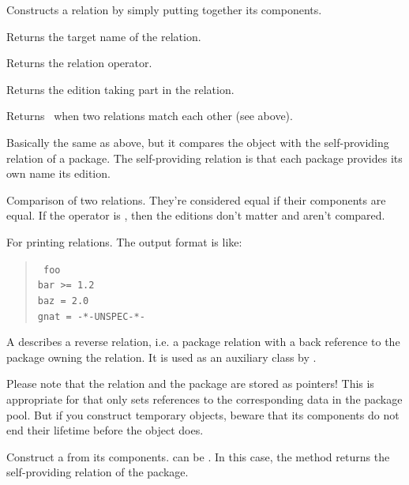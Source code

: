 \documentclass[10pt]{article}
\begin{document}
Constructs a relation by simply putting together its components.

Returns the target name of the relation.

Returns the relation operator.

Returns the edition taking part in the relation.

Returns \true\ when two relations match each other (see above).

Basically the same as above, but it compares the object with the
self-providing relation of a package. The self-providing relation is
that each package provides its own name \val{=} its edition.

Comparison of two relations. They're considered equal if their
components are equal. If the operator is , then the editions
don't matter and aren't compared.

For printing relations. The output format is like:
\begin{quote}\tt
foo \\
bar >= 1.2 \\
baz = 2.0 \\
gnat = -*-UNSPEC-*-
\end{quote}




A  describes a reverse relation, i.e. a package
relation with a back reference to the package owning the relation. It
is used as an auxiliary class by .

Please note that the relation and the package are stored as pointers!
This is appropriate for  that only sets references to
the corresponding data in the package pool. But if you construct
temporary  objects, beware that its components
do not end their lifetime before the  object
does.

Construct a  from its components.  can be
. In this case, the  method returns the
self-providing relation of the package.
\end{document}
